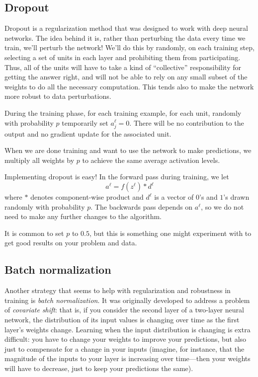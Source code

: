 \subsection{Dropout}
Dropout is a regularization method that was designed to work with deep
neural networks.  The idea behind it is, rather than perturbing the
data every time we train, we'll perturb the network!  We'll do this by
randomly, on each training step, selecting a set of units in each
layer and prohibiting them from participating.   Thus, all of the
units will have to take a kind of  ``collective'' responsibility for
getting the answer right, and will not be able to rely on any small
subset of the weights to do all the necessary computation.  This tends
also to make the network more robust to data perturbations.

During the training phase, for each training example, for each unit,
randomly with probability $p$ temporarily set $a^{\ell}_j = 0$. There
will be no contribution to the output and no gradient update for the
associated unit.

When we are done training and want to use the network to make
predictions, we multiply all weights by $p$ to achieve the same average
activation levels.

Implementing dropout is easy!  In the forward pass during training, we let
$$ a^{\ell} = f(z^{\ell}) * d^{\ell} $$
where $*$ denotes component-wise product and $d^{\ell}$ is a vector of
$0$'s and $1$'s drawn randomly with probability $p$.
The backwards pass depends on $a^{\ell}$, so we do not need to make
any further changes to the algorithm.

It is common to set $p$ to $0.5$, but this is something one might
experiment with to get good results on your problem and data.


\subsection{Batch normalization}

Another strategy that seems to help with regularization and robustness
in training is {\em batch normalization}.  
It was originally
developed to address a problem of {\em covariate shift}:  that is, if
you consider the second layer of a two-layer neural network, the
distribution of its input values is changing over time as the first
layer's  weights change.  Learning when the input distribution is
changing is extra difficult:  you have to change your weights to
improve your predictions, but also just to compensate for a change in
your inputs  (imagine, for instance, that the magnitude of the inputs
to your layer is increasing over time---then your weights will have to
decrease, just to keep your predictions the same).

